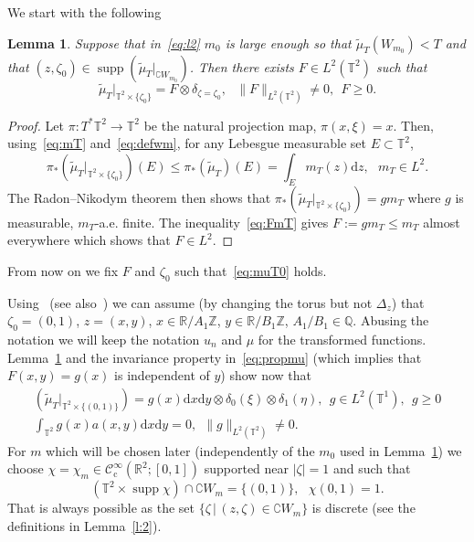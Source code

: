 \documentclass[11pt]{article}
\newtheorem{lemm}[theo]{Lemma}
\theoremstyle{definition}
\numberwithin{equation}{section}
\numberwithin{figure}{section}
\numberwithin{table}{section}
\DeclareMathOperator{\supp}{supp}
\newcommand{\CIc}{{\mathcal C}^\infty_{\mathrm{c}} }
\newcommand{\R}{{\mathbb R}}
\newcommand{\TT}{{\mathbb T}}
\newcommand{\ZZ}{{\mathbb Z}}
\newcommand*{\dd}{\mathrm{d}}
\newcommand*{\dx}{\dd x}
\newcommand*{\dy}{\dd y}
\newcommand*{\dz}{\dd z}
\newcommand*{\tq}{\,|\,}
\begin{document}
We start with the following

\begin{lemm}\label{l:RN}
Suppose that in~\eqref{eq:l2} $ m_0 $ is large enough so that $ \widetilde \mu_T (W_{m_0}) < T $ and that $ (z, \zeta_0) \in \supp (\widetilde \mu_T |_{ \complement W_{m_0} }) $. Then there exists $ F \in L^2 (\TT^2) $ such that
\begin{equation}\label{eq:muT0}
\widetilde \mu_T |_{ \TT^2 \times \{ \zeta_0 \} } = F \otimes \delta_{ \zeta = \zeta_0 }, \ \ \ \| F \|_{ L^2 (\TT^2) } \neq 0, \ \ F \geq 0.
\end{equation}
\end{lemm}

\begin{proof}
Let $ \pi : T^*\TT^2 \to \TT^2 $ be the natural projection map, $ \pi (x, \xi) = x $. Then, using~\eqref{eq:mT} and~\eqref{eq:defwm}, for any Lebesgue measurable set $ E \subset \TT^2 $,
\begin{equation}\label{eq:FmT}
\pi_* (\widetilde \mu_T |_{ \TT^2 \times \{ \zeta_0 \}}) (E)
\leq \pi_* (\widetilde \mu_T) (E) = \int_E m_T (z) \dz, \ \ \ m_T \in L^2.
\end{equation}
The Radon--Nikodym theorem then shows that $ \pi_* (\widetilde \mu_T |_{ \TT^2 \times \{ \zeta_0 \}}) = g m_T $ where $ g $ is measurable, $m_T$-a.e. finite. The inequality~\eqref{eq:FmT} gives $ F := g m_T \leq m_T $ almost everywhere which shows that $ F \in L^2 $.
\end{proof}

From now on we fix $ F $ and $ \zeta_0 $ such that~\eqref{eq:muT0} holds.

Using~\cite[Lemma~2.7]{BZ4} (see also~\cite[Figure~1]{BZ4}) we can assume (by changing the torus but not $ \Delta_z $) that $ \zeta_0 = (0, 1) $, $ z = (x, y) $, $ x \in \R/A_1 \ZZ $, $ y \in \R /B_1 \ZZ $, $ A_1/B_1 \in
\mathbb Q $. Abusing the notation we will keep the notation $ u_n $ and $
\mu $ for the transformed functions. Lemma~\ref{l:RN} and the invariance property in~\eqref{eq:propmu} (which implies that $ F (x, y) = g (x) $ is independent of $ y $) show now that
\begin{equation}\label{eq:muT00}
\begin{gathered}
(\widetilde \mu_T |_{ \TT^2 \times \{ (0,1) \} }) = g (x) \dx\dy \otimes \delta_{0} (\xi) \otimes\delta_1 (\eta), \ \ g \in L^2 (\TT^1), \ \ g \geq 0 \\
\int_{ \TT^2 } g (x) a (x, y) \dx \dy = 0, \ \
\| g \|_{ L^2 (\TT^2)} \neq 0.
\end{gathered}
\end{equation}
For $ m $ which will be chosen later (independently of the $ m_0 $ used in Lemma~\ref{l:RN}) we choose $ \chi = \chi_m \in \CIc (\R^2; [0,1])$ supported near $ | \zeta |= 1 $ and such that
\begin{equation}\label{eq:suppchi}
(\TT^2 \times \supp \chi) \cap \complement W_m = \{ (0, 1) \}, \ \ \ \chi(0,1) = 1.
\end{equation}
That is always possible as the set $ \{\zeta \tq (z, \zeta) \in \complement W_m \} $ is discrete (see the definitions in Lemma~\ref{l:2}).
\end{document}
